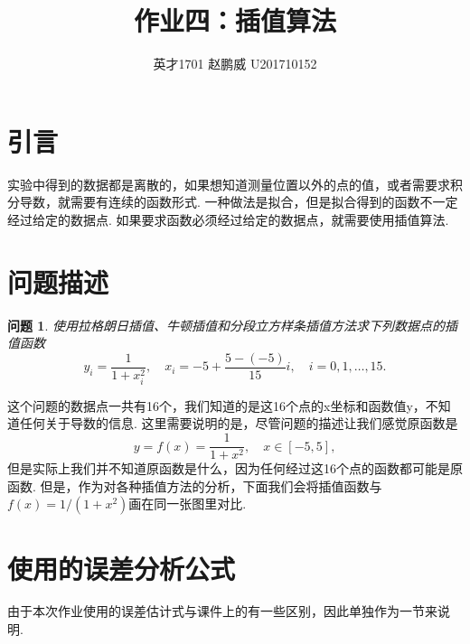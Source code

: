\documentclass{article}
\title{作业四：插值算法}
\author{英才1701 赵鹏威 U201710152}
\newtheorem{task}{问题}
\begin{document}
	\maketitle
	\tableofcontents
	\newpage
	\section{引言}
	实验中得到的数据都是离散的，如果想知道测量位置以外的点的值，或者需要求积分导数，就需要有连续的函数形式. 一种做法是拟合，但是拟合得到的函数不一定经过给定的数据点. 如果要求函数必须经过给定的数据点，就需要使用插值算法.
	
	\section{问题描述}
	\begin{task}
		使用拉格朗日插值、牛顿插值和分段立方样条插值方法求下列数据点的插值函数
		\[
		y_i=\frac{1}{1+x_i^2},\quad x_i=-5+\frac{5-(-5)}{15}i,\quad i=0,1,\dots,15.
		\]
	\end{task}
	这个问题的数据点一共有16个，我们知道的是这16个点的x坐标和函数值y，不知道任何关于导数的信息. 这里需要说明的是，尽管问题的描述让我们感觉原函数是
	\[
	y=f(x)=\frac{1}{1+x^2},\quad x\in[-5,5],
	\]
	但是实际上我们并不知道原函数是什么，因为任何经过这16个点的函数都可能是原函数. 但是，作为对各种插值方法的分析，下面我们会将插值函数与$f(x)=1/(1+x^2)$画在同一张图里对比.
	
	\section{使用的误差分析公式}
	由于本次作业使用的误差估计式与课件上的有一些区别，因此单独作为一节来说明.
\end{document}
